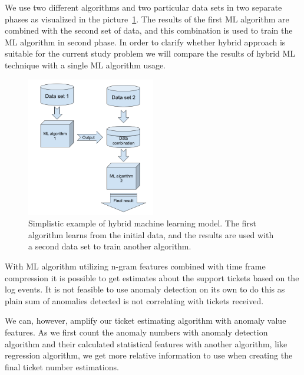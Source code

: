 We use two different algorithms and two particular data sets
in two separate phases as visualized in the picture~\ref{fig:hybrid-ml-model}.
The results of the first ML algorithm are combined
with the second set of data,
and this combination is used to train the ML algorithm in second phase.
In order to clarify whether hybrid approach is suitable for the current study problem
we will compare the results of hybrid ML technique
with a single ML algorithm usage.

\begin{figure}[htb]
    \centering
    \includegraphics[width=0.5\textwidth,]{./appendices/hybrid-ml-model}
    \caption{Simplistic example of hybrid machine learning model.
    The first algorithm learns from the initial data,
        and the results are used with a second data set to train another algorithm.
        \label{fig:hybrid-ml-model}}
\end{figure}


With ML algorithm utilizing n-gram features combined with time frame compression
it is possible to get estimates
about the support tickets based on the log events. %
It is not feasible to use anomaly detection on its own to do this
as plain sum of anomalies detected
is not correlating with tickets received.

We can, however,
amplify our ticket estimating algorithm with anomaly value features.
As we first count the anomaly numbers with anomaly detection algorithm %
and their calculated statistical features with another algorithm,
like regression algorithm,
we get more relative information to use
when creating the final ticket number estimations. %

\clearpage